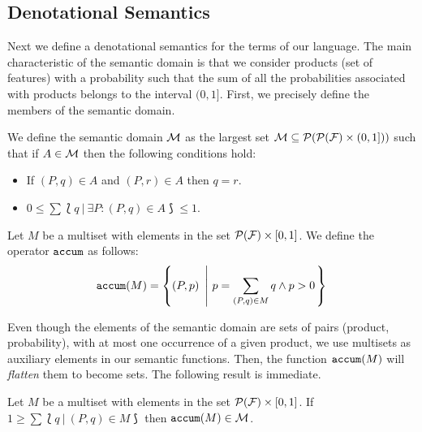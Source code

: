 \subsection{Denotational Semantics}
\label{sec:stat:den}

Next we define a denotational semantics for the terms of our language. The main characteristic of the semantic domain is that we consider products (set of features) with a probability such that the sum of all the probabilities associated with products belongs to the interval $(0,1]$. First, we
precisely define the members of the semantic domain.


\bdfn\label{def:den:pr}
We define the semantic domain ${\cal M}$ as the largest set ${\cal M}\subseteq{\cal P}({\cal P}({\cal F})\times
  (0,1]))$ such that if $A\in{\cal M}$ then the following
  conditions hold:
  \begin{itemize}
  \item If $(P,q)\in A$ and $(P,r)\in A$ then $q=r$.
  \item $0\leq \sum \lbag q \ | \ \exists P: (P,q)\in A\rbag \leq 1$.
  \end{itemize}


Let $M$ be a multiset  with elements in the set ${\cal P}({\cal F})\times [0,1]$.
We define the operator $\mathtt{accum}$ as follows:
  $$\accum(M) = \left\{(P,p)\ \left| \ p=\sum_{(P,q)\in M}q \wedge p>0\right. \right\}$$
\edfn

Even though the elements of the semantic domain are sets of pairs (product, probability), with at most one occurrence of a given product, we use multisets as auxiliary elements in our semantic functions. Then, the function $\mathtt{accum}(M)$ will \emph{flatten} them to become sets.
The following result is immediate.

\bprop\label{prop:pr:accum}
 Let $M$ be a multiset with elements in the set ${\cal P}({\cal F})\times
 [0,1]$. If $1\geq\sum\lbag q\ |\ (P,q)\in M\rbag$
 then $\mathtt{accum}(M)\in{\cal M}$.
\eprop


